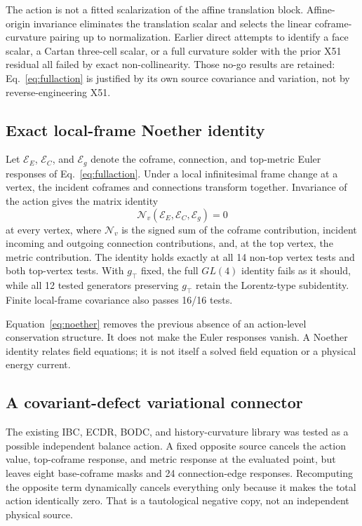 \documentclass[11pt]{article}
\theoremstyle{definition}
\theoremstyle{remark}
\begin{document}
The action is not a fitted scalarization of the affine translation block. Affine-origin invariance eliminates the translation scalar and selects the linear coframe-curvature pairing up to normalization. Earlier direct attempts to identify a face scalar, a Cartan three-cell scalar, or a full curvature solder with the prior X51 residual all failed by exact non-collinearity. Those no-go results are retained: Eq.~\eqref{eq:fullaction} is justified by its own source covariance and variation, not by reverse-engineering X51.

\subsection{Exact local-frame Noether identity}

Let $\mathcal E_E$, $\mathcal E_C$, and $\mathcal E_g$ denote the coframe, connection, and top-metric Euler responses of Eq.~\eqref{eq:fullaction}. Under a local infinitesimal frame change at a vertex, the incident coframes and connections transform together. Invariance of the action gives the matrix identity
\begin{equation}\label{eq:noether}
 \mathcal N_v(\mathcal E_E,\mathcal E_C,\mathcal E_g)=0
\end{equation}
at every vertex, where $\mathcal N_v$ is the signed sum of the coframe contribution, incident incoming and outgoing connection contributions, and, at the top vertex, the metric contribution. The identity holds exactly at all 14 non-top vertex tests and both top-vertex tests. With $g_\top$ fixed, the full $GL(4)$ identity fails as it should, while all 12 tested generators preserving $g_\top$ retain the Lorentz-type subidentity. Finite local-frame covariance also passes 16/16 tests.

Equation~\eqref{eq:noether} removes the previous absence of an action-level conservation structure. It does not make the Euler responses vanish. A Noether identity relates field equations; it is not itself a solved field equation or a physical energy current.

\subsection{A covariant-defect variational connector}

The existing IBC, ECDR, BODC, and history-curvature library was tested as a possible independent balance action. A fixed opposite source cancels the action value, top-coframe response, and metric response at the evaluated point, but leaves eight base-coframe masks and 24 connection-edge responses. Recomputing the opposite term dynamically cancels everything only because it makes the total action identically zero. That is a tautological negative copy, not an independent physical source.
\end{document}
